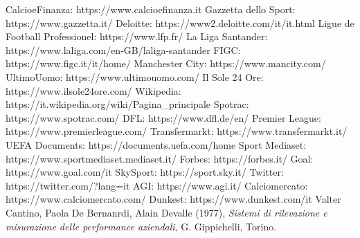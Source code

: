 \documentclass[
    corpo=12pt,
    oneside,
    evenboxes,
    tipotesi=triennale,
    stile=classica,
    oldstyle,
    autoretitolo,
    greek,
]{toptesi}
\begin{document}
\begin{interlinea}{1.5}
\begin{thebibliography}{9}
    CalcioeFinanza: https://www.calcioefinanza.it
    Gazzetta dello Sport: https://www.gazzetta.it/
    Deloitte: https://www2.deloitte.com/it/it.html
    Ligue de Football Professionel: https://www.lfp.fr/
    La Liga Santander: https://www.laliga.com/en-GB/laliga-santander
    FIGC: https://www.figc.it/it/home/
    Manchester City: https://www.mancity.com/
    UltimoUomo: https://www.ultimouomo.com/
    Il Sole 24 Ore: https://www.ilsole24ore.com/
    Wikipedia: https://it.wikipedia.org/wiki/Pagina\_principale
    Spotrac: https://www.spotrac.com/
    DFL: https://www.dfl.de/en/
    Premier League: https://www.premierleague.com/
    Transfermarkt: https://www.transfermarkt.it/
    UEFA Documents: https://documents.uefa.com/home
    Sport Mediaset: https://www.sportmediaset.mediaset.it/
    Forbes: https://forbes.it/
    Goal: https://www.goal.com/it
    SkySport: https://sport.sky.it/
    Twitter: https://twitter.com/?lang=it
    AGI: https://www.agi.it/
    Calciomercato: https://www.calciomercato.com/
    Dunkest: https://www.dunkest.com/it
    Valter Cantino, Paola De Bernanrdi, Alain Devalle (1977),
    \emph{Sistemi di rilevazione e misurazione delle performance aziendali}, G. Gippichelli, Torino.
\end{thebibliography}    
\end{interlinea}
\end{document}
